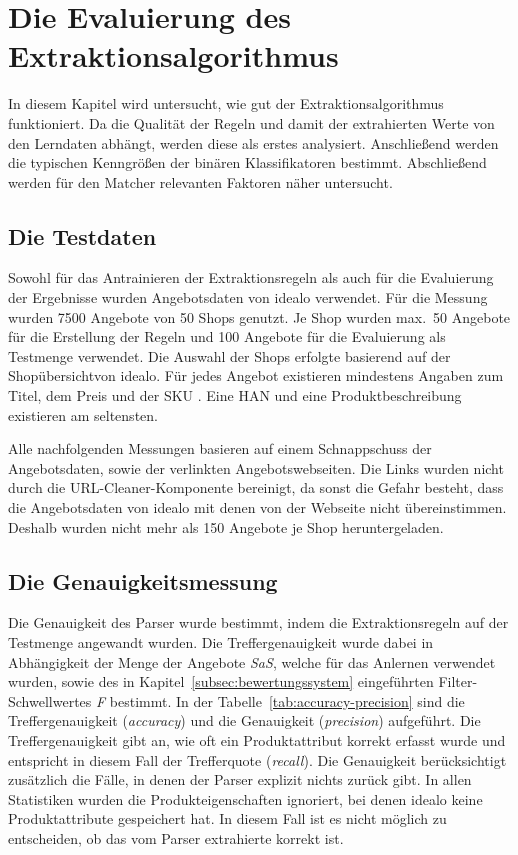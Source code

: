 \section{Die Evaluierung des Extraktionsalgorithmus}
\label{sec:evaluierung}

In diesem Kapitel wird untersucht, wie gut der Extraktionsalgorithmus funktioniert.
Da die Qualität der Regeln und damit der extrahierten Werte von den Lerndaten abhängt, werden diese als erstes
analysiert.
Anschließend werden die typischen Kenngrößen der binären Klassifikatoren bestimmt.
Abschließend werden für den Matcher relevanten Faktoren näher untersucht.

\subsection{Die Testdaten}
\label{subsec:testdaten}
Sowohl für das Antrainieren der Extraktionsregeln als auch für die Evaluierung der Ergebnisse wurden Angebotsdaten
von idealo verwendet.
Für die Messung wurden 7500 Angebote von 50 Shops genutzt.
Je Shop wurden max.\ 50 Angebote für die Erstellung der Regeln und 100 Angebote für die Evaluierung als Testmenge
verwendet.
Die Auswahl der Shops erfolgte basierend auf der Shopübersicht\footnotemark von idealo.
Für jedes Angebot existieren mindestens Angaben zum Titel, dem Preis und der SKU .
Eine HAN und eine Produktbeschreibung existieren am seltensten.

Alle nachfolgenden Messungen basieren auf einem Schnappschuss der Angebotsdaten, sowie der verlinkten Angebotswebseiten.
Die Links wurden nicht durch die URL-Cleaner-Komponente bereinigt, da sonst die Gefahr besteht, dass die
Angebotsdaten von idealo mit denen von der Webseite nicht übereinstimmen.
Deshalb wurden nicht mehr als 150 Angebote je Shop heruntergeladen.

\subsection{Die Genauigkeitsmessung}
\label{subsec:genauigkeitsmessung}
Die Genauigkeit des Parser wurde bestimmt, indem die Extraktionsregeln auf der Testmenge angewandt wurden.
Die Treffergenauigkeit wurde dabei in Abhängigkeit der Menge der Angebote \textit{SaS}, welche für das Anlernen
verwendet wurden, sowie des in Kapitel~\ref{subsec:bewertungssystem} eingeführten Filter-Schwellwertes \textit{F}
bestimmt.
In der Tabelle~\ref{tab:accuracy-precision} sind die Treffergenauigkeit (\textit{accuracy}) und die Genauigkeit
(\textit{precision}) aufgeführt.
Die Treffergenauigkeit gibt an, wie oft ein Produktattribut korrekt erfasst wurde und entspricht in diesem Fall der
Trefferquote (\textit{recall}).
Die Genauigkeit berücksichtigt zusätzlich die Fälle, in denen der Parser explizit nichts zurück gibt.
In allen Statistiken wurden die Produkteigenschaften ignoriert, bei denen idealo keine Produktattribute gespeichert hat.
In diesem Fall ist es nicht möglich zu entscheiden, ob das vom Parser extrahierte korrekt ist.

